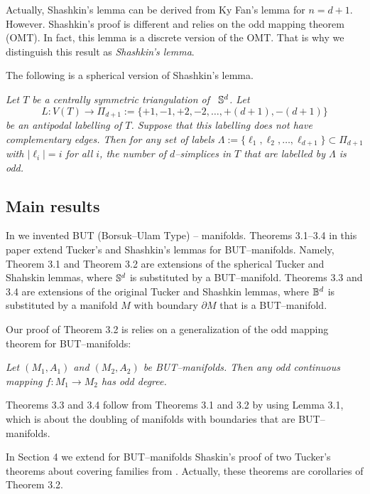 \documentclass[a4paper,12pt]{article}
\begin{document}
Actually, Shashkin's lemma can be derived from Ky Fan's lemma for $n=d+1$.  However. Shashkin's proof is different and relies on the odd mapping theorem (OMT).  In fact, this lemma is a discrete version of the OMT. That is why we distinguish this result as {\it Shashkin's lemma}.

\medskip

The following is a spherical version of Shashkin's lemma.

\medskip

   {\it Let $T$ be a centrally symmetric  triangulation of \, ${\Bbb S}^d$. Let
$$
L:V(T)\to \Pi_{d+1}:=\{+1,-1,+2,-2,\ldots, +(d+1),-(d+1)\}
$$
be an antipodal  labelling of $T$.  Suppose that this labelling does not have complementary edges. Then for any set of  labels $\Lambda:=\{\ell_1,\ell_2,\ldots,\ell_{d+1}\}\subset\Pi_{d+1}$ with $|\ell_i|=i$ for all $i$, the number of $d$--simplices in $T$ that are labelled by $\Lambda$  is odd. }

\subsection{Main results}

In \cite{Mus} we invented BUT (Borsuk--Ulam Type) -- manifolds.
Theorems 3.1--3.4 in this paper extend Tucker's and Shashkin's lemmas for BUT--manifolds. Namely, Theorem 3.1 and Theorem 3.2 are extensions of the spherical Tucker and Shahskin lemmas,  where ${\Bbb S}^d$ is substituted by a BUT--manifold.  Theorems 3.3 and 3.4 are extensions  of the original Tucker and Shashkin lemmas, where   ${\Bbb B}^d$ is substituted by a manifold $M$ with boundary $\partial M$ that is a BUT--manifold.

 Our proof of Theorem 3.2  is relies on a generalization of the odd mapping theorem for BUT--manifolds:

\medskip

 {\it Let $(M_1,A_1)$ and $(M_2,A_2)$ be  BUT--manifolds. Then any odd  continuous mapping $f:M_1\to M_2$ has odd degree.}

\medskip


Theorems 3.3 and 3.4 follow from Theorems 3.1 and 3.2 by using Lemma 3.1, which is about the doubling of manifolds with boundaries that are BUT--manifolds.

In Section 4 we extend  for BUT--manifolds Shaskin's proof of two Tucker's theorems about covering families from \cite{Tucker}. Actually, these theorems are corollaries of Theorem 3.2. 
\end{document}
